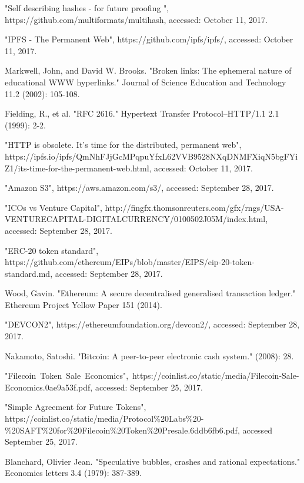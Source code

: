 \documentclass[conference]{IEEEtran}
\begin{document}
\begin{thebibliography}{1}
 "Self describing hashes - for future proofing
", https://github.com/multiformats/multihash, accessed: October 11, 2017.

 "IPFS - The Permanent Web", https://github.com/ipfs/ipfs/, accessed: October 11, 2017.

 Markwell, John, and David W. Brooks. "Broken links: The ephemeral nature of educational WWW hyperlinks." Journal of Science Education and Technology 11.2 (2002): 105-108.

 Fielding, R., et al. "RFC 2616." Hypertext Transfer Protocol–HTTP/1.1 2.1 (1999): 2-2.

 "HTTP is obsolete. It's time for the distributed, permanent web", https://ipfs.io/ipfs/QmNhFJjGcMPqpuYfxL62VVB9528NXqDNMFXiqN5bgFYiZ1/its-time-for-the-permanent-web.html, accessed: October 11, 2017.

 "Amazon S3", https://aws.amazon.com/s3/, accessed: September 28, 2017.

 "ICOs vs Venture Capital", http://fingfx.thomsonreuters.com/gfx/rngs/USA-VENTURECAPITAL-DIGITALCURRENCY/0100502J05M/index.html, accessed: September 28, 2017.

 "ERC-20 token standard", https://github.com/ethereum/EIPs/blob/master/EIPS/eip-20-token-standard.md, accessed: September 28, 2017.

 Wood, Gavin. "Ethereum: A secure decentralised generalised transaction ledger." Ethereum Project Yellow Paper 151 (2014).

 "DEVCON2", https://ethereumfoundation.org/devcon2/, accessed: September 28, 2017.

 Nakamoto, Satoshi. "Bitcoin: A peer-to-peer electronic cash system." (2008): 28.

 "Filecoin Token Sale Economics", https://coinlist.co/static/media/Filecoin-Sale-Economics.0ae9a53f.pdf, accessed: September 25, 2017.

 "Simple Agreement for Future Tokens", https://coinlist.co/static/media/Protocol\%20Labs\%20-\%20SAFT\%20for\%20Filecoin\%20Token\%20Presale.6ddb6fb6.pdf, accessed September 25, 2017.

 Blanchard, Olivier Jean. "Speculative bubbles, crashes and rational expectations." Economics letters 3.4 (1979): 387-389. %


\end{thebibliography}
\end{document}
